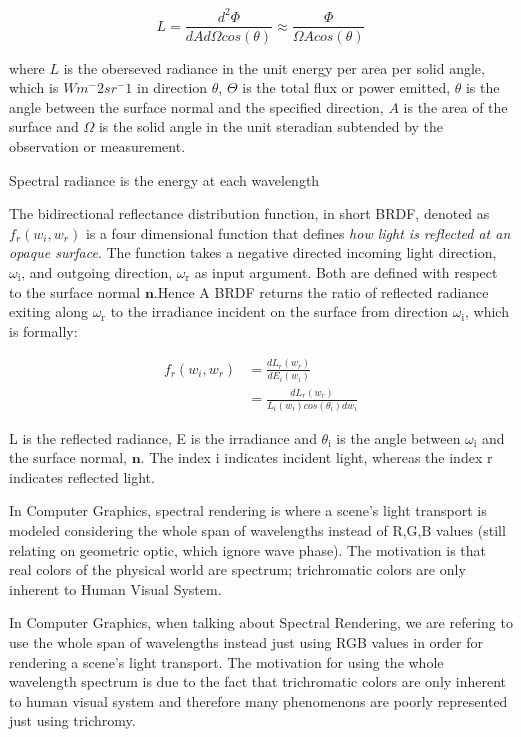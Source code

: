 \begin{equation}
 L = \frac{d^2 \Phi}{dA d\Omega cos(\theta)} \approx \frac{\Phi}{\Omega A cos(\theta)}
\end{equation}

where $L$ is the oberseved radiance in the unit energy per area per solid angle, which is $Wm^-2 sr^-1$ in direction $\theta$, $\Theta$ is the total flux or power emitted, $\theta$ is the angle between the surface normal and the specified direction, $A$ is the area of the surface and $\Omega$ is the solid angle in the unit steradian subtended by the observation or measurement.

Spectral radiance is the energy at each wavelength

The bidirectional reflectance distribution function, in short BRDF, denoted as $f_r(w_i, w_r)$ is a four dimensional function that defines \textit{how light is reflected at an opaque surface}. The function takes a negative directed incoming light direction, $\omega_{\text{i}}$, and outgoing direction, $\omega_{\text{r}}$ as input argument. Both are defined with respect to the surface normal $\mathbf{n}$.Hence A BRDF returns the ratio of reflected radiance exiting along $\omega_{\text{r}}$ to the irradiance incident on the surface from direction $\omega_{\text{i}}$, which is formally:
  
\begin{align}
  f_r(w_i, w_r)
  & = \frac{dL_r(w_r)}{dE_i(w_i)} \\
  & = \frac{dL_r(w_r)}{L_i(w_i)cos(\theta_i)dw_i}
\end{align}

L is the reflected radiance, E is the irradiance and $\theta_{\text{i}}$ is the angle between $\omega_{\text{i}}$ and the surface normal, $\mathbf n$. The index $\text{i}$ indicates incident light, whereas the index $\text{r}$ indicates reflected light.

In Computer Graphics, spectral rendering is where a scene's light transport is modeled considering the whole span of wavelengths instead of R,G,B values (still relating on geometric optic, which ignore wave phase). The motivation is that real colors of the physical world are spectrum; trichromatic colors are only inherent to Human Visual System.

In Computer Graphics, when talking about Spectral Rendering, we are refering to use the whole span of wavelengths instead just using RGB values in order for rendering a scene's light transport. The motivation for using the whole wavelength spectrum is due to the fact that trichromatic colors are only inherent to human visual system and therefore many phenomenons are poorly represented just using trichromy. 

